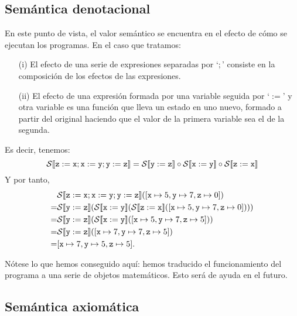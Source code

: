\subsection{Semántica denotacional}

En este punto de vista, el valor semántico se encuentra en el efecto de cómo se ejecutan los programas. En el caso que tratamos:
\begin{itemize}
    \item[(i)] El efecto de una serie de expresiones separadas por `$;$' consiste en la composición de los efectos de las expresiones.
    \item[(ii)] El efecto de una expresión formada por una variable seguida por `$:=$' y otra variable es una función que lleva un estado en uno nuevo, formado a partir del original haciendo que el valor de la primera variable sea el de la segunda.
\end{itemize}
Es decir, tenemos:
$$\mathcal{S}[\![ \nz:= \nx; \nx := \ny; \ny := \nz ]\!] = \mathcal{S}[\![ \ny := \nz  ]\!]\circ \mathcal{S}[\![ \nx := \ny  ]\!]\circ \mathcal{S}[\![ \nz := \nx  ]\!]$$
Y por tanto, 
\begin{align*}
     & \mathcal{S}[\![ \nz:= \nx; \nx := \ny; \ny := \nz ]\!]([\nx \mapsto 5, \ny \mapsto 7, \nz \mapsto 0]) \\
    = &\mathcal{S}[\![ \ny := \nz  ]\!](\mathcal{S}[\![ \nx := \ny  ]\!](\mathcal{S}[\![ \nz := \nx  ]\!]([\nx \mapsto 5, \ny \mapsto 7, \nz \mapsto 0]))) \\
    = & \mathcal{S}[\![ \ny := \nz  ]\!](\mathcal{S}[\![ \nx := \ny  ]\!]([\nx \mapsto 5, \ny \mapsto 7, \nz \mapsto 5])) \\
    = & \mathcal{S}[\![ \ny := \nz  ]\!]([\nx \mapsto 7, \ny \mapsto 7, \nz \mapsto 5]) \\
    = & [\nx \mapsto 7, \ny \mapsto 5, \nz \mapsto 5].
\end{align*}

Nótese lo que hemos conseguido aquí: hemos traducido el funcionamiento del programa a una serie de objetos matemáticos. Esto será de ayuda en el futuro.

\subsection{Semántica axiomática}

